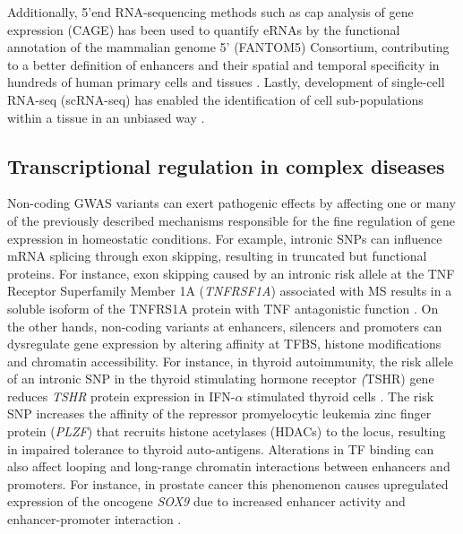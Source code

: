 Additionally, 5’end RNA-sequencing methods such as cap analysis of gene expression (CAGE) has been used to quantify eRNAs by the functional annotation of the mammalian genome 5' (FANTOM5) Consortium, contributing to a better definition of enhancers and their spatial and temporal specificity in hundreds of human primary cells and tissues \parencite{FANTOM2014,Andersson2014}. 
Lastly, development of single-cell RNA-seq (scRNA-seq) has enabled the identification of cell sub-populations within a tissue in an unbiased way \parencite{Tang2009, Tang2010}. 

\subsection{Transcriptional regulation in complex diseases}

Non-coding GWAS variants can exert pathogenic effects by affecting one or many of the previously described mechanisms responsible for the fine regulation of gene expression in homeostatic conditions. For example, intronic SNPs can influence mRNA splicing through exon skipping, resulting in truncated but functional proteins. For instance, exon skipping caused by an intronic risk allele at the TNF Receptor Superfamily Member 1A (\textit{TNFRSF1A}) associated with MS results in a soluble isoform of the TNFRS1A protein with TNF antagonistic function \parencite{Gregory2012}. On the other hands, non-coding variants at enhancers, silencers and promoters can dysregulate gene expression by altering affinity at TFBS, histone modifications and chromatin accessibility. For instance, in thyroid autoimmunity, the risk allele of an intronic SNP in the thyroid stimulating hormone receptor \textit(TSHR) gene reduces \textit{TSHR} protein expression in IFN-$\alpha$ stimulated thyroid cells \parencite{Stefan2014}. The risk SNP increases the affinity of the repressor promyelocytic leukemia zinc finger protein (\textit{PLZF}) that recruits histone acetylases (HDACs) to the locus, resulting in impaired tolerance to thyroid auto-antigens. Alterations in TF binding can also affect looping and long-range chromatin interactions between enhancers and promoters. For instance, in prostate cancer this phenomenon causes upregulated expression of the oncogene \textit{SOX9} due to increased enhancer activity and enhancer-promoter interaction \parencite{Zhang2012}. 


